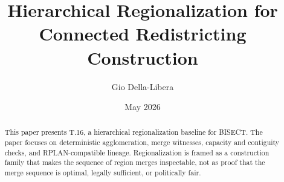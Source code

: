 \documentclass[12pt]{article}
\title{Hierarchical Regionalization for Connected Redistricting Construction}
\author{Gio Della-Libera}
\date{May 2026}
\begin{document}
\maketitle

\begin{abstract}
This paper presents T.16, a hierarchical regionalization baseline for BISECT.
The paper focuses on deterministic agglomeration, merge witnesses, capacity and
contiguity checks, and RPLAN-compatible lineage. Regionalization is framed as a
construction family that makes the sequence of region merges inspectable, not
as proof that the merge sequence is optimal, legally sufficient, or politically
fair.
\end{abstract}









\nocite{bisect-t16-spec}


\end{document}
